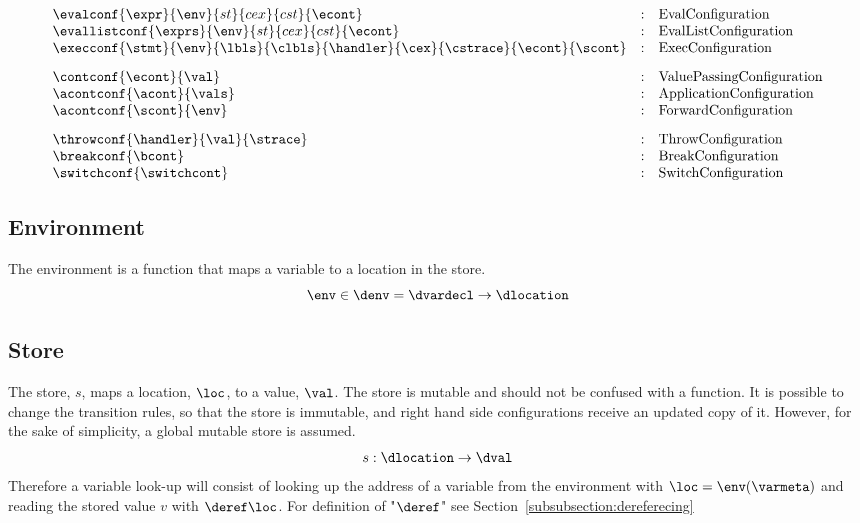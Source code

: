 \documentclass{article}
\begin{document}
\[
\begin{array}{lcl}
\evalconf{\expr}{\env}{st}{cex}{cst}{\econt} & : &
\textrm{EvalConfiguration}\\

\evallistconf{\exprs}{\env}{st}{cex}{cst}{\econt} & : & 
\textrm{EvalListConfiguration} \\

\execconf{\stmt}{\env}{\lbls}{\clbls}{\handler}{\cex}{\cstrace}{\econt}{\scont}  & : & 
\textrm{ExecConfiguration}\\[3mm]

\contconf{\econt}{\val} & : & 
\textrm{ValuePassingConfiguration} \\

\acontconf{\acont}{\vals}& : & 
\textrm{ApplicationConfiguration} \\

\acontconf{\scont}{\env} & : & 
\textrm{ForwardConfiguration} \\[3mm]

\throwconf{\handler}{\val}{\strace} & : & 
\textrm{ThrowConfiguration} \\

\breakconf{\bcont} & : & 
\textrm{BreakConfiguration} \\

\switchconf{\switchcont} & : & 
 \textrm{SwitchConfiguration}\\

\end{array}
\]
\subsection{Environment}
The environment is a function that maps a variable to a location in the store.
\[\env \in \denv = \dvardecl \rightarrow \dlocation\] 
\subsection{Store}
The store, $s$, maps a location, $\loc$, to a value, $\val$. The store is mutable and should not be confused with a function. It is possible to change the transition rules, so that the store is immutable, and right hand side configurations receive an updated copy of it. However, for the sake of simplicity, a global mutable store is assumed. 
\[s : \dlocation \rightarrow \dval \]
Therefore a variable look-up will consist of looking up the address of a variable from the environment with $\loc = \env(\varmeta)$ and reading the stored value $v$ with $\deref\loc$. For definition of "$\deref$" see Section~\ref{subsubsection:dereferecing} 
\end{document}
